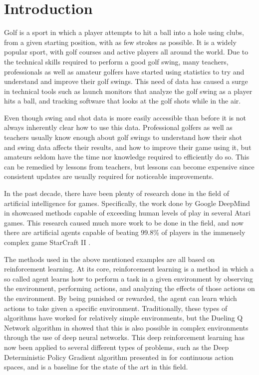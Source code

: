 \documentclass{kththesis}
\begin{document}
\mainmatter


\chapter{Introduction}
\label{chapter:introduction}
Golf is a sport in which a player attempts to hit a ball into a hole using clubs, from a given starting position, with as few strokes as possible. It is a widely popular sport, with golf courses and active players all around the world. Due to the technical skills required to perform a good golf swing, many teachers, professionals as well as amateur golfers have started using statistics to try and understand and improve their golf swings. This need of data has caused a surge in technical tools such as launch monitors that analyze the golf swing as a player hits a ball, and tracking software that looks at the golf shots while in the air. 

Even though swing and shot data is more easily accessible than before it is not always inherently clear how to use this data. Professional golfers as well as teachers usually know enough about golf swings to understand how their shot and swing data affects their results, and how to improve their game using it, but amateurs seldom have the time nor knowledge required to efficiently do so. This can be remedied by lessons from teachers, but lessons can become expensive since consistent updates are usually required for noticeable improvements. 

In the past decade, there have been plenty of research done in the field of artificial intelligence for games. Specifically, the work done by Google DeepMind in \parencite{mnih2015human} showcased methods capable of exceeding human levels of play in several Atari games. This research caused much more work to be done in the field, and now there are artificial agents capable of beating 99.8\% of players in the immensely complex game StarCraft II \parencite{vinyals2019grandmaster}. 

The methods used in the above mentioned examples are all based on reinforcement learning. At its core, reinforcement learning is a method in which a so called agent learns how to perform a task in a given environment by observing the environment, performing actions, and analyzing the effects of those actions on the environment. By being punished or rewarded, the agent can learn which actions to take given a specific environment. Traditionally, these types of algorithms have worked for relatively simple environments, but the Dueling Q Network algorithm in \parencite{mnih2015human} showed that this is also possible in complex environments through the use of deep neural networks. This deep reinforcement learning has now been applied to several different types of problems, such as the Deep Deterministic Policy Gradient algorithm presented in \parencite{lillicrap2015continuous} for continuous action spaces, and is a baseline for the state of the art in this field.
\end{document}
